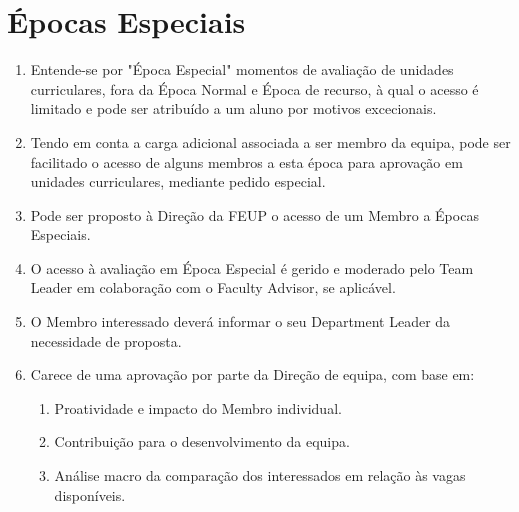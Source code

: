 \section{Épocas Especiais}
\begin{enumerate}
  \item Entende-se por "Época Especial" momentos de avaliação de unidades curriculares, fora da Época Normal e Época de recurso, à qual o acesso é limitado e pode ser atribuído a um aluno por motivos excecionais.
  \item Tendo em conta a carga adicional associada a ser membro da equipa, pode ser facilitado o acesso de alguns membros a esta época para aprovação em unidades curriculares, mediante pedido especial.
  \item Pode ser proposto à Direção da FEUP o acesso de um Membro a Épocas Especiais.
  \item O acesso à avaliação em Época Especial é gerido e moderado pelo Team Leader em colaboração com o Faculty Advisor, se aplicável.
  \item O Membro interessado deverá informar o seu Department Leader da necessidade de proposta.
  \item Carece de uma aprovação por parte da Direção de equipa, com base em:
  \begin{enumerate}
    \item Proatividade e impacto do Membro individual.
    \item Contribuição para o desenvolvimento da equipa.
    \item Análise macro da comparação dos interessados em relação às vagas disponíveis.
  \end{enumerate}
\end{enumerate}
